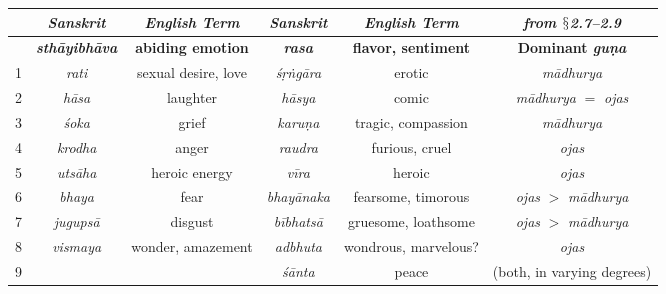\documentclass[10pt]{article}
\begin{document}
\vspace{2mm}
\begin{tabular}{|c||c|c||c|c||c|}
	\hline
	  & \textit{Sanskrit}    & \textit{English Term}    & \textit{Sanskrit} & \textit{English Term}      & \textit{from \(\mathsection\)2.7--2.9}   \\
	\hline
	  & \textbf{\textit{sthāyibhāva}} & \textbf{abiding emotion} & \textbf{\textit{rasa}}     & \textbf{flavor, sentiment} & \textbf{ Dominant \textit{guṇa}}     \\
	\hline
	1 & \textit{rati}                 & sexual desire, love      & \textit{śṛṅgāra}           & erotic                     & \textit{mādhurya}                   \\
	\hline
	2 & \textit{hāsa}                 & laughter                 & \textit{hāsya}             & comic                      & \textit{mādhurya} \(=\) \textit{ojas}        \\
	\hline
	3 & \textit{śoka}                 & grief                    & \textit{karuṇa}            & tragic, compassion         & \textit{mādhurya}                   \\
	\hline
	4 & \textit{krodha}               & anger                    & \textit{raudra}            & furious, cruel             & \textit{ojas}                       \\
	\hline
	5 & \textit{utsāha}               & heroic energy            & \textit{vīra}              & heroic                     & \textit{ojas}                       \\
	\hline
	6 & \textit{bhaya}                & fear                     & \textit{bhayānaka}         & fearsome, timorous         & \textit{ojas} \(>\) \textit{mādhurya}        \\
	\hline
	7 & \textit{jugupsā}              & disgust                  & \textit{bībhatsā}          & gruesome, loathsome        & \textit{ojas} \(>\) \textit{mādhurya}        \\
	\hline
	8 & \textit{vismaya}              & wonder, amazement        & \textit{adbhuta}           & wondrous, marvelous?       & \textit{ojas}                       \\
	\hline
	9 &                      &                          & \textit{śānta}             & peace                      & (both, in varying degrees) \\
	\hline
\end{tabular}
\vspace{1mm}
\end{document}
